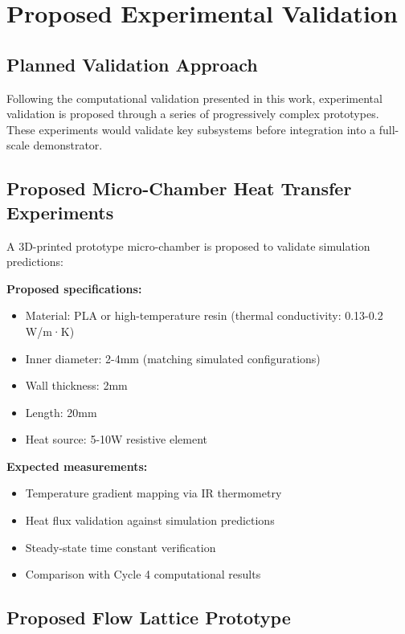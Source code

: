 \section{Proposed Experimental Validation}
\label{sec:experiments}

\subsection{Planned Validation Approach}

Following the computational validation presented in this work, experimental validation is proposed through a series of progressively complex prototypes. These experiments would validate key subsystems before integration into a full-scale demonstrator.

\subsection{Proposed Micro-Chamber Heat Transfer Experiments}

A 3D-printed prototype micro-chamber is proposed to validate simulation predictions:

\textbf{Proposed specifications:}
\begin{itemize}
    \item Material: PLA or high-temperature resin (thermal conductivity: 0.13-0.2 W/m·K)
    \item Inner diameter: 2-4mm (matching simulated configurations)
    \item Wall thickness: 2mm
    \item Length: 20mm
    \item Heat source: 5-10W resistive element
\end{itemize}

\textbf{Expected measurements:}
\begin{itemize}
    \item Temperature gradient mapping via IR thermometry
    \item Heat flux validation against simulation predictions
    \item Steady-state time constant verification
    \item Comparison with Cycle 4 computational results
\end{itemize}

\subsection{Proposed Flow Lattice Prototype}

